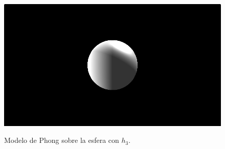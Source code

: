 \begin{figure}[H]
  \centering
  \captionsetup{justification=centering}%
  \includegraphics[width=1.0\textwidth]{secciones/imagenes/lightmodel/phong.png}\label{fig:phong}
  \caption{Modelo de Phong sobre la esfera con \(h_3\).}
\end{figure}


\newpage

